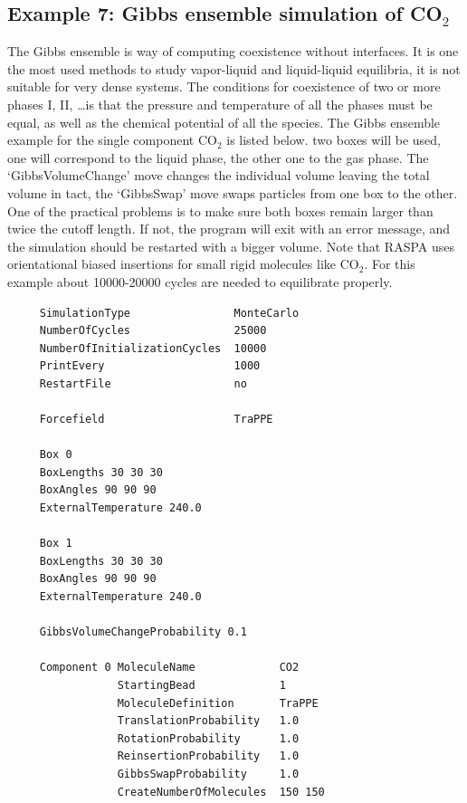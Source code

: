\subsection*{Example 7: Gibbs ensemble simulation of CO$_2$}

The Gibbs ensemble is way of computing coexistence without interfaces. It is one the most used methods
to study vapor-liquid and liquid-liquid equilibria, it is not suitable for very dense systems. The 
conditions for coexistence of two or more phases I, II, \dots is that the pressure and temperature 
of all the phases must be equal, as well as the chemical potential of all the species. The Gibbs
ensemble example for the single component CO$_2$ is listed below. two boxes will be used, one will
correspond to the liquid phase, the other one to the gas phase. The `GibbsVolumeChange' move
changes the individual volume leaving the total volume in tact, the `GibbsSwap' move
swaps particles from one box to the other. One of the practical problems is to make sure both
boxes remain larger than twice the cutoff length. If not, the program will exit with an error message,
and the simulation should be restarted with a bigger volume. 
Note that RASPA uses orientational biased insertions for small rigid molecules like CO$_2$.
For this example about 10000-20000 cycles are needed to equilibrate properly.
\begin{tiny}
\begin{verbatim}
     SimulationType                MonteCarlo
     NumberOfCycles                25000
     NumberOfInitializationCycles  10000
     PrintEvery                    1000
     RestartFile                   no
     
     Forcefield                    TraPPE
     
     Box 0
     BoxLengths 30 30 30
     BoxAngles 90 90 90
     ExternalTemperature 240.0
     
     Box 1
     BoxLengths 30 30 30
     BoxAngles 90 90 90
     ExternalTemperature 240.0
     
     GibbsVolumeChangeProbability 0.1
     
     Component 0 MoleculeName             CO2
                 StartingBead             1
                 MoleculeDefinition       TraPPE
                 TranslationProbability   1.0
                 RotationProbability      1.0
                 ReinsertionProbability   1.0
                 GibbsSwapProbability     1.0
                 CreateNumberOfMolecules  150 150
\end{verbatim}
\end{tiny}

